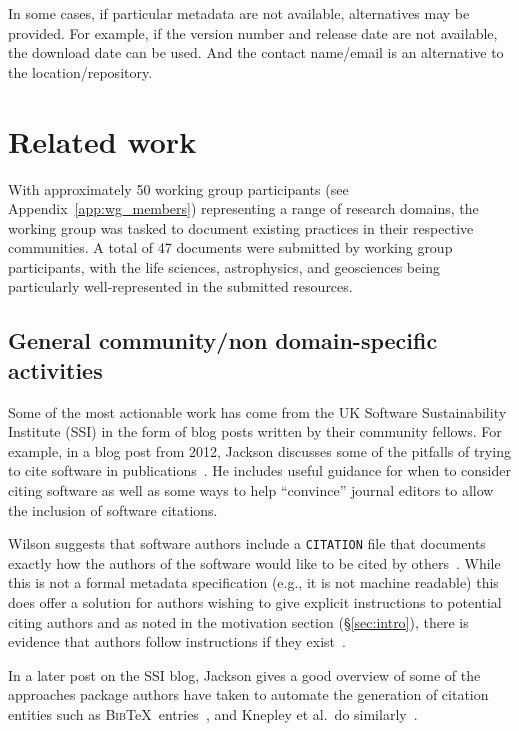\documentclass[12pt, oneside]{amsart}
\begin{document}
In some cases, if particular metadata are not available, alternatives may be provided.
For example, if the version number and release date are not available, the download date can be used.
And the contact name\slash email is an alternative to the location\slash repository.


\section{Related work}
\label{sec:related_work}

With approximately 50 working group participants (see Appendix~\ref{app:wg_members})
representing a range of research domains, the working group was tasked to
document existing practices in their respective communities. A total of 47
documents were submitted by working group participants, with the life sciences,
astrophysics, and geosciences being particularly well-represented in the
submitted resources.

\subsection{General community/non domain-specific activities}

Some of the most actionable work has come from the UK Software Sustainability
Institute (SSI) in the form of blog posts written by their community fellows.
For example, in a blog post from 2012, Jackson discusses some of the pitfalls
of trying to cite software in publications~\cite{ssi-how-to-cite}. He includes
useful guidance for when to consider citing software as well as some ways to help
``convince'' journal editors to allow the inclusion of software citations.

Wilson suggests that software authors include a \texttt{CITATION} file that
documents exactly how the authors of the software would like to be cited by
others~\cite{ssi-citation-files}. While this is not a formal metadata
specification (e.g., it is not machine readable) this does offer a solution for
authors wishing to give explicit instructions to potential citing authors and as
noted in the motivation section (\S\ref{sec:intro}), there is evidence that
authors follow instructions if they exist~\cite{10.1371/journal.pone.0136631}.

In a later post on the SSI blog, Jackson gives a good overview of some of the
approaches package authors have taken to automate the generation of citation
entities such as \textsc{Bib}\TeX\ entries~\cite{ssi-how-shalt-i-cite-thee}, and
Knepley et al.\ do similarly~\cite{knepley2013accurately}.
\end{document}
